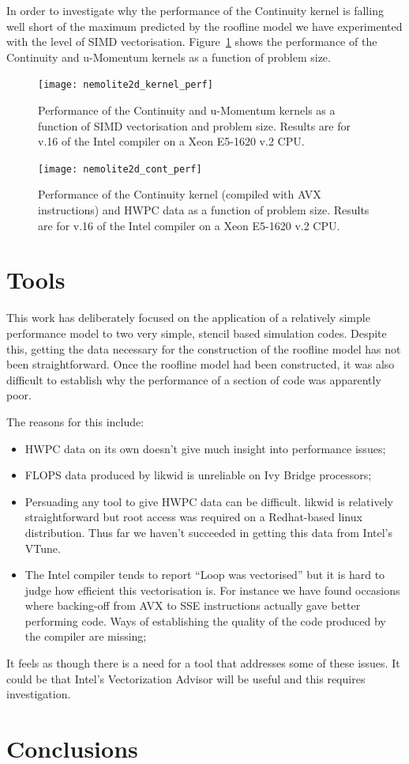 \documentclass[12pt]{article}
\begin{document}
In order to investigate why the performance of the Continuity kernel
is falling well short of the maximum predicted by the roofline model
we have experimented with the level of SIMD
vectorisation. Figure~\ref{FIG_kernel_perf} shows the performance of
the Continuity and u-Momentum kernels as a function of problem size.

\begin{figure}
  \centering
  \texttt{[image: nemolite2d\_kernel\_perf]}
  \caption{Performance of the Continuity and u-Momentum kernels as a
    function of SIMD vectorisation and problem size. Results are for
    v.16 of the Intel compiler on a Xeon E5-1620 v.2 CPU.}
  \label{FIG_kernel_perf}
\end{figure}

\begin{figure}
  \centering
  \texttt{[image: nemolite2d\_cont\_perf]}
  \caption{Performance of the Continuity kernel (compiled with AVX
    instructions) and HWPC data as a function of problem size. Results
    are for v.16 of the Intel compiler on a Xeon E5-1620 v.2 CPU.}
  \label{FIG_cont_perf}
\end{figure}

\section{Tools}

This work has deliberately focused on the application of a relatively
simple performance model to two very simple, stencil based simulation
codes.  Despite this, getting the data necessary for the construction
of the roofline model has not been straightforward. Once the roofline
model had been constructed, it was also difficult to establish why the
performance of a section of code was apparently poor.

The reasons for this include:
\begin{itemize}
\item HWPC data on its own doesn't give much insight into performance issues;
\item FLOPS data produced by likwid is unreliable on Ivy Bridge processors;
\item Persuading any tool to give HWPC data can be difficult. likwid
  is relatively straightforward but root access was required on a
  Redhat-based linux distribution. Thus far we haven't succeeded in
  getting this data from Intel's VTune.
\item The Intel compiler tends to report ``Loop was vectorised'' but
  it is hard to judge how efficient this vectorisation is. For
  instance we have found occasions where backing-off from AVX to SSE
  instructions actually gave better performing code. Ways of
  establishing the quality of the code produced by the compiler are
  missing;
\end{itemize}

It feels as though there is a need for a tool that addresses some of
these issues. It could be that Intel's Vectorization Advisor will be
useful and this requires investigation.


\section{Conclusions}



\end{document}
